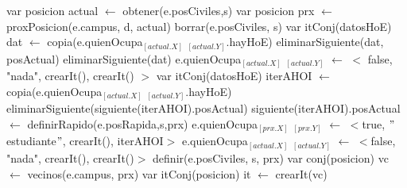 \begin{algorithm}[H]
  \algsetup{\footnotesize}
  \scriptsize
\begin{algorithmic}[1]
 
	\State var posicion actual $\gets$ obtener(e.posCiviles,s)  
	\State var posicion prx $\gets$ proxPosicion(e.campus, d, actual)  
		\State borrar(e.posCiviles, s) 
		\State var itConj(datosHoE) dat $\gets$ copia(e.quienOcupa$_{[actual.X]}$ $_{[actual.Y]}$.hayHoE) 
		\State eliminarSiguiente(dat, posActual) 
		\State eliminarSiguiente(dat) 
		\State e.quienOcupa$_{[actual.X]}$ $_{[actual.Y]}$ $\gets$ $<$ false, "nada", crearIt(), crearIt() $>$ 
	\Else
		\State var itConj(datosHoE) iterAHOI $\gets$ copia(e.quienOcupa$_{[actual.X]}$ $_{[actual.Y]}$.hayHoE) 
		\State eliminarSiguiente(siguiente(iterAHOI).posActual) 
		\State siguiente(iterAHOI).posActual $\gets$ definirRapido(e.posRapida,s,prx) 
		\State e.quienOcupa$_{[prx.X]}$ $_{[prx.Y]}$ $\gets$ $<$true, $"$estudiante$"$, crearIt(), iterAHOI$>$ 
		\State e.quienOcupa$_{[actual.X]}$ $_{[actual.Y]}$ $\gets$ $<$false, "nada", crearIt(), crearIt()$>$ 
		\State definir(e.posCiviles, s, prx) 
		\State var conj(posicion) vc $\gets$ vecinos(e.campus, prx) 
		\State var itConj(posicion) it $\gets$ crearIt(vc) 
		

\end{algorithmic}
\end{algorithm}
